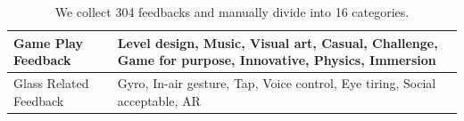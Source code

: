 \begin{table}[!h]
\newcommand{\tabincell}[2]{\begin{tabular}{@{}#1@{}}#2\end{tabular}}
   \centering
   \begin{tabular}{|p{}|p{}|}
     \hline
     \multicolumn{1}{|p{0.3\columnwidth}|}{Game Play Feedback} &
     \multicolumn{1}{|p{0.5\columnwidth}|}{Level design, Music, Visual art, Casual, Challenge, Game for purpose, Innovative, Physics, Immersion} \\
     \hline
     \multicolumn{1}{|p{0.3\columnwidth}|}{Glass Related Feedback} & 
     \multicolumn{1}{|p{0.5\columnwidth}|}{Gyro, In-air gesture, Tap, Voice control, Eye tiring, Social acceptable, AR} \\
     \hline
   \end{tabular}
   \caption{We collect 304 feedbacks and manually divide into 16 categories.}
   \label{tab:table1}
 \end{table}


